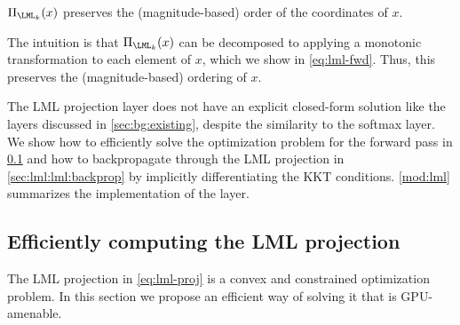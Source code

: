 \begin{proposition}\label{prop:order}
  $\Pi_{\LML_k}(x)$ preserves the (magnitude-based) order of
  the coordinates of $x$.
\end{proposition}
The intuition is that $\Pi_{\LML_k}(x)$ can be decomposed
to applying a monotonic transformation
to each element of $x$, which we show in \cref{eq:lml-fwd}.
Thus, this preserves the (magnitude-based) ordering of $x$.

The LML projection layer does not have an explicit closed-form
solution like the layers discussed in \cref{sec:bg:existing},
despite the similarity to the softmax layer.
We show how to efficiently solve the optimization problem
for the forward pass in \cref{sec:lml:lml:efficient}
and how to backpropagate through the LML projection in
\cref{sec:lml:lml:backprop} by implicitly differentiating
the KKT conditions.
\cref{mod:lml} summarizes the
implementation of the layer.


\newpage
\subsection{Efficiently computing the LML projection}
\label{sec:lml:lml:efficient}
The LML projection in \cref{eq:lml-proj} is a convex and
constrained optimization problem. In this section we
propose an efficient way of solving it that is GPU-amenable.

